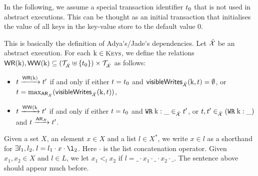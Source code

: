 In the following, we assume a special transaction identifier $t_0$ that is not used 
in abstract executions. This can be thought as an initial transaction that initialises the value of all 
keys in the key-value store to the default value $0$.
\begin{definition}
\ac{This is basically the definition of Adya's/Jade's dependencies.}
Let $\hat{\mathcal{X}}$ be an abstract execution. For each $\key{k} \in \Addr$, 
we define the relations ${\mathsf{WR}}(\mathrm{k}), {\mathsf{WW}}(\mathrm{k}) \subseteq (\mathcal{T}_{\hat{\mathcal{X}}} \uplus \{t_0\}) \times 
\mathcal{T}_{\hat{\mathcal{X}}}$ as follows: 
\begin{itemize}
\item $t \xrightarrow{{\mathsf{WR}}(\mathrm{k})} t'$ if and only if either $t = t_0$ and 
$\mathsf{visibleWrites}_{\hat{\mathcal{X}}}(\mathrm{k}, t) = \emptyset$, or 
$t = \max_{{\sf{AR}}_{\hat{\mathcal{X}}}}(\mathsf{visibleWrites}_{\hat{\mathcal{X}}}(\mathrm{k}, t))$, 
\item $t \xrightarrow{{\mathsf{WW}}(\mathrm{k}} t'$ if and only if either $t = t_0$ 
and ${{\tt WR}}\;\mathrm{k}: \_ \in_{\hat{\mathcal{X}}} t'$, or $t, t' \in_{\hat{\mathcal{X}}} ({{\tt WR}}\;\mathrm{k}: \_)$ 
and $t \xrightarrow{{\sf{AR}}_{\mathcal{X}}} t'$.
\end{itemize}
\end{definition}

Given a set $X$, an element $x \in X$ and a list $l \in X^{\ast}$, we write 
$x \in l$ as a shorthand for $\exists l_1, l_2. \; l = l_1 \cdot x \cdot \l_2$. 
Here $\cdot$ is the list concatenation operator. Given $x_1, x_2 \in X$ and 
$l \in L$, we let $x_1 <_{l} x_2$ if $l = \_ \cdot x_1 \cdot \_ \cdot x_2 \cdot \_$.
\ac{The sentence above should appear much before.}

